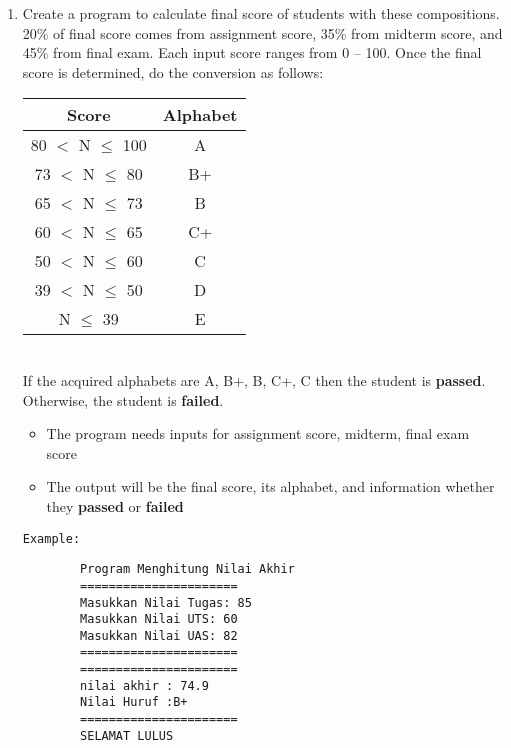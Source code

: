\documentclass[12pt,titlepage]{article}
\begin{document}
\begin{enumerate}
    \item Create a program to calculate final score of students with these compositions. 20\% of final score comes from assignment score, 35\% from midterm score, and 45\% from final exam. Each input score ranges from 0 – 100. Once the final score is determined, do the conversion as follows: \mbox{}\\
    \begin{tabular}{|c|c|}
        \hline
        \textbf{Score} & \textbf{Alphabet} \\
        \hline
        80 $<$ N $\le$ 100 & A \\
        \hline
        73 $<$ N $\le$ 80 & B+ \\
        \hline
        65 $<$ N $\le$ 73 & B \\
        \hline
        60 $<$ N $\le$ 65 & C+ \\
        \hline
        50 $<$ N $\le$ 60 & C \\
        \hline
        39 $<$ N $\le$ 50 & D \\
        \hline
        N $\le$ 39 & E \\
        \hline
    \end{tabular}
    \mbox{}\\
    If the acquired alphabets are A, B+, B, C+, C then the student is \textbf{passed}. Otherwise, the student is \textbf{failed}.
    \begin{itemize}
        \item The program needs inputs for assignment score, midterm, final exam score
        \item The output will be the final score, its alphabet, and information whether they \textbf{passed} or \textbf{failed}
    \end{itemize}
    \texttt{Example:}
    \begin{verbatim}
        Program Menghitung Nilai Akhir
        ======================
        Masukkan Nilai Tugas: 85
        Masukkan Nilai UTS: 60
        Masukkan Nilai UAS: 82
        ======================
        ======================
        nilai akhir : 74.9
        Nilai Huruf :B+
        ======================
        SELAMAT LULUS
    \end{verbatim}
\end{enumerate}

\newpage
\end{document}
